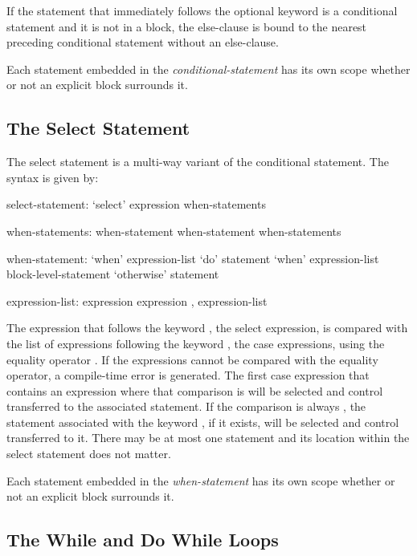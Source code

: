 If the statement that immediately follows the optional 
keyword is a conditional statement and it is not in a block, the
else-clause is bound to the nearest preceding conditional statement
without an else-clause.

Each statement embedded in the {\em conditional-statement} has its own
scope whether or not an explicit block surrounds it.

\subsection{The Select Statement}
\label{The_Select_Statement}


The select statement is a multi-way variant of the conditional
statement.  The syntax is given by:
\begin{syntax}
select-statement:
  `select' expression { when-statements }

when-statements:
  when-statement
  when-statement when-statements

when-statement:
  `when' expression-list `do' statement
  `when' expression-list block-level-statement
  `otherwise' statement

expression-list:
  expression
  expression , expression-list
\end{syntax}
The expression that follows the keyword , the select
expression, is compared with the list of expressions following the
keyword , the case expressions, using the equality
operator \chpl{==}.  If the expressions cannot be compared with the
equality operator, a compile-time error is generated.  The first case
expression that contains an expression where that comparison
is  will be selected and control transferred to the
associated statement.  If the comparison is always , the
statement associated with the keyword , if it exists,
will be selected and control transferred to it.  There may be at most
one  statement and its location within the select
statement does not matter.

Each statement embedded in the {\em when-statement} has its own scope
whether or not an explicit block surrounds it.

\subsection{The While and Do While Loops}
\label{The_While_and_Do_While_Loops}

